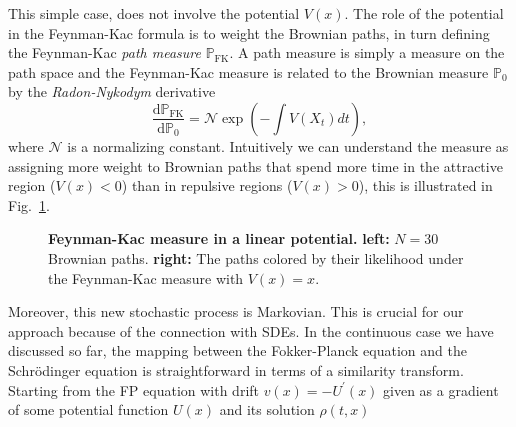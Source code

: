 This simple case, does not involve the potential $V(x)$. The role of the potential in the Feynman-Kac formula is to weight the Brownian paths, in turn defining the Feynman-Kac \emph{path measure} $\mathbb{P}_{\mathrm{FK}}$. A path measure is simply a measure on the path space and the Feynman-Kac measure is related to the Brownian measure $\mathbb{P}_{0}$ by the \emph{Radon-Nykodym} derivative
\begin{equation}
	\frac{\mathrm{d} \mathbb{P}_{\mathrm{FK}}}{\mathrm{d} \mathbb{P}_{0}}=\mathcal{N} \exp \left(-\int V\left(X_{t}\right) d t\right),
\end{equation}
where $\mathcal{N}$ is a normalizing constant. Intuitively we can understand the measure as assigning more weight to Brownian paths that spend more time in the attractive region ($V(x) < 0$) than in repulsive regions ($V(x) > 0$), this is illustrated in Fig.~\ref{fig:fkac_measure_reweight}.
\begin{figure}[H]
	\centering
	\caption[Feynman-Kac measure in a linear potential]{\textbf{Feynman-Kac measure in a linear potential.} 
		\textbf{left:} $N=30$ Brownian paths. \textbf{right:} The paths colored by their likelihood under the Feynman-Kac measure with $V(x)=x$. }
	\label{fig:fkac_measure_reweight}
\end{figure}
Moreover, this new stochastic process is Markovian. This is crucial for our approach because of the connection with SDEs. In the continuous case we have discussed so far, the mapping between the Fokker-Planck equation and the Schr\" odinger equation is straightforward in terms of a similarity transform. Starting from the FP equation with drift $v(x)=-U^\prime(x)$ given as a gradient of some potential function $U(x)$ and its solution $\rho(t, x)$ 
